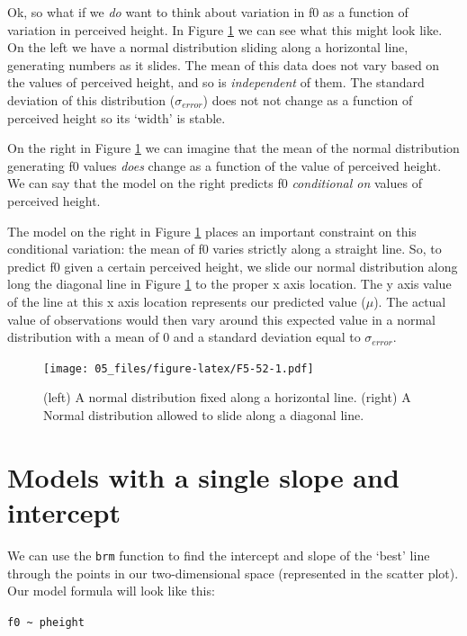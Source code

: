 \documentclass[
]{book}
\begin{document}
Ok, so what if we \emph{do} want to think about variation in f0 as a function of variation in perceived height. In Figure \ref{fig:F5-52} we can see what this might look like. On the left we have a normal distribution sliding along a horizontal line, generating numbers as it slides. The mean of this data does not vary based on the values of perceived height, and so is \emph{independent} of them. The standard deviation of this distribution (\(\sigma_{error}\)) does not not change as a function of perceived height so its `width' is stable.

On the right in Figure \ref{fig:F5-52} we can imagine that the mean of the normal distribution generating f0 values \emph{does} change as a function of the value of perceived height. We can say that the model on the right predicts f0 \emph{conditional on} values of perceived height.

The model on the right in Figure \ref{fig:F5-52} places an important constraint on this conditional variation: the mean of f0 varies strictly along a straight line. So, to predict f0 given a certain perceived height, we slide our normal distribution along long the diagonal line in Figure \ref{fig:F5-52} to the proper x axis location. The y axis value of the line at this x axis location represents our predicted value (\(\mu\)). The actual value of observations would then vary around this expected value in a normal distribution with a mean of 0 and a standard deviation equal to \(\sigma_{error}\).

\begin{figure}
\centering
\texttt{[image: 05\_files/figure-latex/F5-52-1.pdf]}
\caption{\label{fig:F5-52}(left) A normal distribution fixed along a horizontal line. (right) A Normal distribution allowed to slide along a diagonal line.}
\end{figure}

\hypertarget{models-with-a-single-slope-and-intercept}{%
\section{Models with a single slope and intercept}\label{models-with-a-single-slope-and-intercept}}

We can use the \texttt{brm} function to find the intercept and slope of the `best' line through the points in our two-dimensional space (represented in the scatter plot). Our model formula will look like this:

\texttt{f0\ \textasciitilde{}\ pheight}
\end{document}
